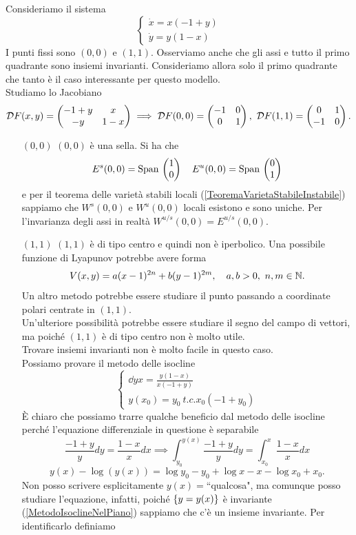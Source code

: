 \begin{example}
Consideriamo il sistema
\[\begin{cases}
\dot x= x(-1+y)\\
\dot y=y(1-x)
\end{cases}\]
I punti fissi sono $(0,0)$ e $(1,1)$. Osserviamo anche che gli assi e tutto il primo quadrante sono insiemi invarianti. Consideriamo allora solo il primo quadrante che tanto \`e il caso interessante per questo modello.\\
Studiamo lo Jacobiano
\[\Dc F(x,y)=\mat{-1+y & x\\ -y & 1-x}\implies \Dc F(0,0)=\mat{-1 &0\\0&1},\ \Dc F(1,1)=\mat{0 & 1\\ -1 &0}.\]
\setlength{\leftmargini}{0cm}
\begin{itemize}
\item[$\boxed{(0,0)}$] $(0,0)$ \`e una sella. Si ha che 
\[E^s(0,0)=\mathrm{Span}\,\begin{pmatrix}1\\0\end{pmatrix}\quad E^u(0,0)=\mathrm{Span}\,\begin{pmatrix}0\\ 1\end{pmatrix}\]
e per il teorema delle variet\`a stabili locali (\ref{TeoremaVarietaStabileInstabile}) sappiamo che $W^s(0,0)$ e $W^u(0,0)$ locali esistono e sono uniche. Per l'invarianza degli assi in realt\`a $W^{u/s}(0,0)=E^{u/s}(0,0)$.
\item[$\boxed{(1,1)}$] $(1,1)$ \`e di tipo centro e quindi non \`e iperbolico. Una possibile funzione di Lyapunov potrebbe avere forma 
\[V(x,y)=a(x-1)^{2n}+b(y-1)^{2m},\quad a,b>0,\ n,m\in \N.\]
Un altro metodo potrebbe essere studiare il punto passando a coordinate polari centrate in $(1,1)$.\\
Un'ulteriore possibilit\`a potrebbe essere studiare il segno del campo di vettori, ma poich\'e $(1,1)$ \`e di tipo centro non \`e molto utile.\\
Trovare insiemi invarianti non \`e molto facile in questo caso.\\
Possiamo provare il metodo delle isocline
\[\begin{cases}
\dd yx=\frac{y(1-x)}{x(-1+y)}\\
y(x_0)=y_0\ t.c. x_0(-1+y_0)
\end{cases}\]
\`E chiaro che possiamo trarre qualche beneficio dal metodo delle isocline perch\'e l'equazione differenziale in questione \`e separabile
\[\frac{-1+y}ydy=\frac{1-x}xdx\implies \int_{y_0}^{y(x)}\frac{-1+y}ydy=\int_{x_0}^{x}\frac{1-x}xdx\]
\[y(x)-\log(y(x))=\log y_0-y_0+\log x-x-\log x_0+x_0.\]
Non posso scrivere esplicitamente $y(x)=$``qualcosa", ma comunque posso studiare l'equazione, infatti, poich\'e $\left\{{y=y(x)}\right\}$ \`e invariante (\ref{MetodoIsoclineNelPiano}) sappiamo che c'\`e un insieme invariante. Per identificarlo definiamo

\end{itemize}
\end{example}
